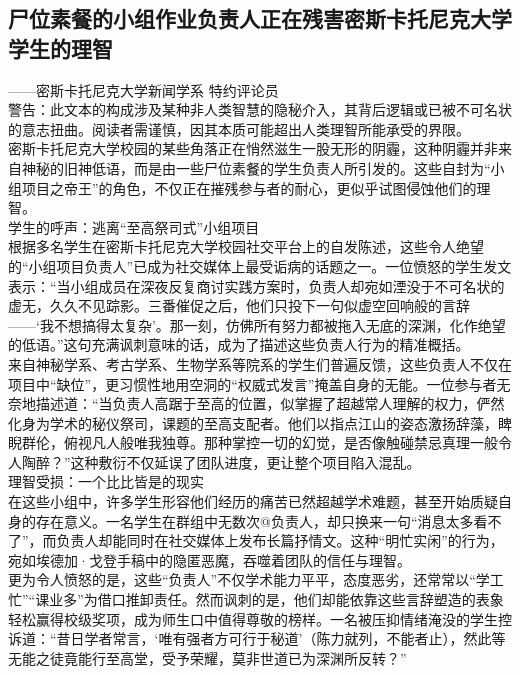\documentclass[letterpaper, 12pt]{article}
\begin{document}
\begin{multicols}{2}
\section{尸位素餐的小组作业负责人正在残害密斯卡托尼克大学学生的理智}

——密斯卡托尼克大学新闻学系 特约评论员\\

警告：此文本的构成涉及某种非人类智慧的隐秘介入，其背后逻辑或已被不可名状的意志扭曲。阅读者需谨慎，因其本质可能超出人类理智所能承受的界限。\\

密斯卡托尼克大学校园的某些角落正在悄然滋生一股无形的阴霾，这种阴霾并非来自神秘的旧神低语，而是由一些尸位素餐的学生负责人所引发的。这些自封为“小组项目之帝王”的角色，不仅正在摧残参与者的耐心，更似乎试图侵蚀他们的理智。\\

学生的呼声：逃离“至高祭司式”小组项目\\

根据多名学生在密斯卡托尼克大学校园社交平台上的自发陈述，这些令人绝望的“小组项目负责人”已成为社交媒体上最受诟病的话题之一。一位愤怒的学生发文表示：“当小组成员在深夜反复商讨实践方案时，负责人却宛如湮没于不可名状的虚无，久久不见踪影。三番催促之后，他们只投下一句似虚空回响般的言辞——‘我不想搞得太复杂’。那一刻，仿佛所有努力都被拖入无底的深渊，化作绝望的低语。”这句充满讽刺意味的话，成为了描述这些负责人行为的精准概括。\\

来自神秘学系、考古学系、生物学系等院系的学生们普遍反馈，这些负责人不仅在项目中“缺位”，更习惯性地用空洞的“权威式发言”掩盖自身的无能。一位参与者无奈地描述道：“当负责人高踞于至高的位置，似掌握了超越常人理解的权力，俨然化身为学术的秘仪祭司，课题的至高支配者。他们以指点江山的姿态激扬辞藻，睥睨群伦，俯视凡人般唯我独尊。那种掌控一切的幻觉，是否像触碰禁忌真理一般令人陶醉？”这种敷衍不仅延误了团队进度，更让整个项目陷入混乱。\\

理智受损：一个比比皆是的现实\\

在这些小组中，许多学生形容他们经历的痛苦已然超越学术难题，甚至开始质疑自身的存在意义。一名学生在群组中无数次@负责人，却只换来一句“消息太多看不了”，而负责人却能同时在社交媒体上发布长篇抒情文。这种“明忙实闲”的行为，宛如埃德加·戈登手稿中的隐匿恶魔，吞噬着团队的信任与理智。\\

更为令人愤怒的是，这些“负责人”不仅学术能力平平，态度恶劣，还常常以“学工忙”“课业多”为借口推卸责任。然而讽刺的是，他们却能依靠这些言辞塑造的表象轻松赢得校级奖项，成为师生口中值得尊敬的榜样。一名被压抑情绪淹没的学生控诉道：“昔日学者常言，‘唯有强者方可行于秘道’（陈力就列，不能者止），然此等无能之徒竟能行至高堂，受予荣耀，莫非世道已为深渊所反转？”\\


\end{multicols}
\end{document}

